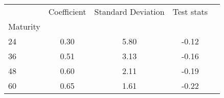 \begin{tabular}{lcccc}
\toprule
{} &  Coefficient &  Standard Deviation &  Test stats \\
Maturity &              &                     &             \\
\midrule
24       &         0.30 &                5.80 &       -0.12 \\
36       &         0.51 &                3.13 &       -0.16 \\
48       &         0.60 &                2.11 &       -0.19 \\
60       &         0.65 &                1.61 &       -0.22 \\
\bottomrule
\end{tabular}
